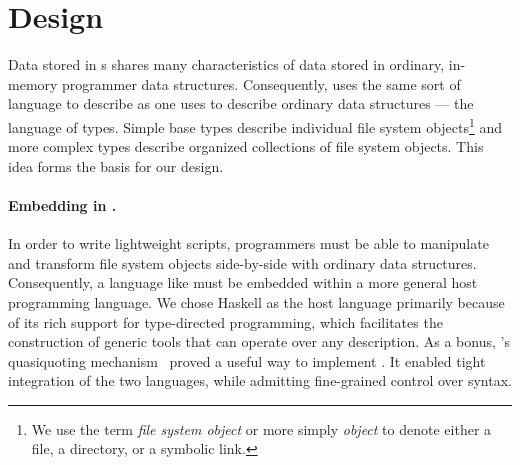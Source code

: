 \section{\forest{} Design}
\label{sec:language}

Data stored in \filestore{}s shares many characteristics of
data stored in ordinary, in-memory programmer data structures.
Consequently, \forest{}
uses the same sort of language to describe \filestores{} as one uses to describe
ordinary data structures --- the language of types. 
Simple base
types describe individual file system objects\footnote{We use the term
\emph{file system object} or more simply \emph{object} to denote either a
file, a directory, or a symbolic link.} and more complex types 
describe organized collections of file system 
objects. 
This idea forms the basis for our design.

\paragraph*{Embedding \forest{} in \haskell{}.}
In order to write lightweight scripts, 
programmers must be able to manipulate and transform file system 
objects side-by-side with ordinary data structures.  Consequently,
a language like \forest{} must be embedded within a more general
host programming language.
We chose
Haskell as the host language primarily because of its rich support for 
type-directed programming, which facilitates the construction of generic 
tools that can operate over any \forest{}
description.  As a bonus, \haskell{}'s quasiquoting 
mechanism~\cite{Mainland:quasi} proved a
useful way to implement \forest{}.  It enabled tight integration of
the two languages, while admitting fine-grained control 
over \forest{} syntax.
  


